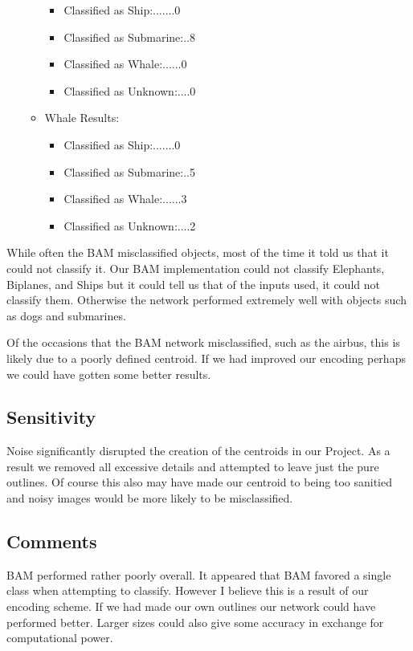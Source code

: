 \documentclass{article}
\begin{document}
\begin{itemize}
\begin{itemize}
                \begin{itemize}
                    \item Classified as Ship:.......0
                    \item Classified as Submarine:..8
                    \item Classified as Whale:......0
                    \item Classified as Unknown:....0
                \end{itemize}
            \item Whale Results:
                \begin{itemize}
                    \item Classified as Ship:.......0
                    \item Classified as Submarine:..5
                    \item Classified as Whale:......3
                    \item Classified as Unknown:....2
                \end{itemize}
        \end{itemize}
\end{itemize}

While often the BAM misclassified objects, most of the time it told us that
it could not classify it. Our BAM implementation could not classify Elephants, 
Biplanes, and Ships but it could tell us that of the inputs used, it could not
classify them. Otherwise the network performed extremely well with objects
such as dogs and submarines.

Of the occasions that the BAM network misclassified, such as the airbus, this is 
likely due to a poorly defined centroid. If we had improved our encoding perhaps 
we could have gotten some better results.

\subsection{Sensitivity}
Noise significantly disrupted the creation of the centroids in our Project.
As a result we removed all excessive details and attempted to leave just
the pure outlines. Of course this also may have made our centroid to being
too sanitied and noisy images would be more likely to be misclassified.

\subsection{Comments}
BAM performed rather poorly overall. It appeared that BAM favored a single class when 
attempting to classify. However I believe this is a result of our encoding 
scheme. If we had made our own outlines our network could have performed 
better. Larger sizes could also give some accuracy in exchange for computational 
power. 
\end{document}
